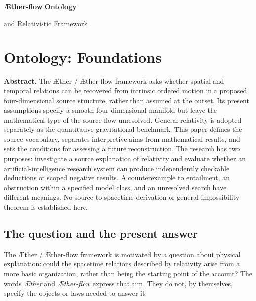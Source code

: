 \documentclass[11pt,oneside]{report}
\newcommand{\ArticleShort}{}
\newcommand{\Aether}{\AE{}ther}
\newcommand{\Aflow}{\AE{}ther-flow}
\newcommand{\TheoryProgram}{\Aether{} / \Aflow{} framework}
\theoremstyle{remark}
\numberwithin{definition}{chapter}
\numberwithin{proposition}{chapter}
\numberwithin{remark}{chapter}
\newcommand{\ChapterAbstract}[1]{%
  \begingroup
  \setlength{\parindent}{0pt}%
  \small\textbf{Abstract.} #1\par
  \endgroup
  \vspace{0.55\baselineskip}%
}
\begin{document}
\thispagestyle{plain}
\vspace*{1.65in}
\begin{center}
  {\fontsize{29}{35}\selectfont\bfseries\color{ink}\AE{}ther-flow Ontology\par}
  \vspace{0.45in}
  {\LARGE\color{ink}and Relativistic Framework\par}
\end{center}
\vfill
\clearpage
\renewcommand{\ArticleShort}{Contents}
\begingroup
\small{}
\tableofcontents
\endgroup
\clearpage
{}

\clearpage
\renewcommand{\ArticleShort}{Foundations}
\chapter{Ontology: Foundations}
\label{chapter:foundations}
\ChapterAbstract{The \Aether{} / \Aflow{} framework asks whether spatial and temporal relations can be recovered from intrinsic ordered motion in a proposed four-dimensional source structure, rather than assumed at the outset. Its present assumptions specify a smooth four-dimensional manifold but leave the mathematical type of the source flow unresolved. General relativity is adopted separately as the quantitative gravitational benchmark. This paper defines the source vocabulary, separates interpretive aims from mathematical results, and sets the conditions for assessing a future reconstruction. The research has two purposes: investigate a source explanation of relativity and evaluate whether an artificial-intelligence research system can produce independently checkable deductions or scoped negative results. A counterexample to entailment, an obstruction within a specified model class, and an unresolved search have different meanings. No source-to-spacetime derivation or general impossibility theorem is established here.}

\section{The question and the present answer}
The \TheoryProgram{} is motivated by a question about physical explanation: could the spacetime relations described by relativity arise from a more basic organization, rather than being the starting point of the account? The words \emph{\Aether{}} and \emph{\Aflow{}} express that aim. They do not, by themselves, specify the objects or laws needed to answer it.
\end{document}
